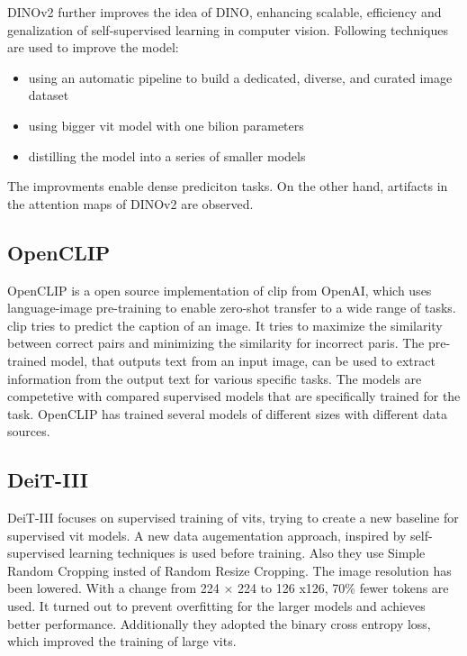 \documentclass[conference]{IEEEtran}
\begin{document}
  \mbox{DINOv2} further improves the idea of \mbox{DINO}, enhancing scalable, efficiency and genalization of self-supervised learning in computer vision. Following techniques are used to improve the model:
  \begin{itemize}
    \item  using an automatic pipeline to build a dedicated, diverse, and curated image dataset
    \item  using bigger \ac{vit} model with one bilion parameters
    \item distilling the model into a series of smaller models \cite{dinov2}
  \end{itemize}
  The improvments enable dense prediciton tasks. On the other hand, artifacts in the attention maps of \mbox{DINOv2} are observed. \cite{registers}

  \subsection{OpenCLIP}
  \mbox{OpenCLIP} is a open source implementation of \ac{clip} \cite{clip} from OpenAI, which uses language-image pre-training to enable zero-shot transfer to a wide range of tasks. \ac{clip} tries to predict the caption of an image. It tries to maximize the similarity between correct pairs and minimizing the similarity for incorrect paris. The pre-trained model, that outputs text from an input image, can be used to extract information from the output text for various specific tasks. The models are competetive with compared supervised models that are specifically trained for the task. \cite{clip}
  \mbox{OpenCLIP} has trained several models of different sizes with different data sources. \cite{open-clip} 

  \subsection{\mbox{DeiT-III}}
  \mbox{DeiT-III} focuses on supervised training of \acp{vit}, trying to create a new baseline for supervised \ac{vit} models. A new data augementation approach, inspired by self-supervised learning techniques is used before training. Also they use Simple Random Cropping insted of Random Resize Cropping. The image resolution has been lowered. With a change from 224 × 224 to 126 x126, 70\% fewer tokens are used. It turned out to prevent overfitting for the larger models and achieves better performance. Additionally they adopted the binary cross entropy loss, which improved the training of large \acp{vit}. \cite{deit3}
\end{document}
